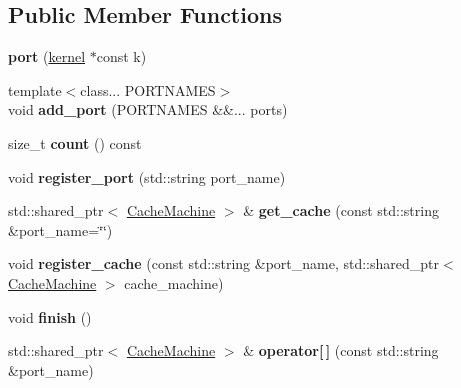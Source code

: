 \subsection*{Public Member Functions}
\begin{DoxyCompactItemize}
\item 
\mbox{\label{classral_1_1cache_1_1port_a4991d849a145eeabf7d8fa2ebfaf01e3}} 
{\bfseries port} (\hyperlink{classral_1_1cache_1_1kernel}{kernel} $\ast$const k)
\item 
\mbox{\label{classral_1_1cache_1_1port_ac188682dc9f01caa7754404261ef39fb}} 
{\footnotesize template$<$class... P\+O\+R\+T\+N\+A\+M\+ES$>$ }\\void {\bfseries add\+\_\+port} (P\+O\+R\+T\+N\+A\+M\+ES \&\&... ports)
\item 
\mbox{\label{classral_1_1cache_1_1port_a0dc8040e17784860b766451848171bdf}} 
size\+\_\+t {\bfseries count} () const
\item 
\mbox{\label{classral_1_1cache_1_1port_a809c9029738a25c5c4c2d03d06763433}} 
void {\bfseries register\+\_\+port} (std\+::string port\+\_\+name)
\item 
\mbox{\label{classral_1_1cache_1_1port_a8638993db9a78603732e99d14a7f9bfb}} 
std\+::shared\+\_\+ptr$<$ \hyperlink{classral_1_1cache_1_1CacheMachine}{Cache\+Machine} $>$ \& {\bfseries get\+\_\+cache} (const std\+::string \&port\+\_\+name=\char`\"{}\char`\"{})
\item 
\mbox{\label{classral_1_1cache_1_1port_ad953c937a1aa16e3e7dce3ccb3e457cc}} 
void {\bfseries register\+\_\+cache} (const std\+::string \&port\+\_\+name, std\+::shared\+\_\+ptr$<$ \hyperlink{classral_1_1cache_1_1CacheMachine}{Cache\+Machine} $>$ cache\+\_\+machine)
\item 
\mbox{\label{classral_1_1cache_1_1port_af593d246e90b414eedfe0ae6b062099a}} 
void {\bfseries finish} ()
\item 
\mbox{\label{classral_1_1cache_1_1port_a1b2a397860df89e9403ce73e99c7f4fc}} 
std\+::shared\+\_\+ptr$<$ \hyperlink{classral_1_1cache_1_1CacheMachine}{Cache\+Machine} $>$ \& {\bfseries operator\mbox{[}$\,$\mbox{]}} (const std\+::string \&port\+\_\+name)

\end{DoxyCompactItemize}
